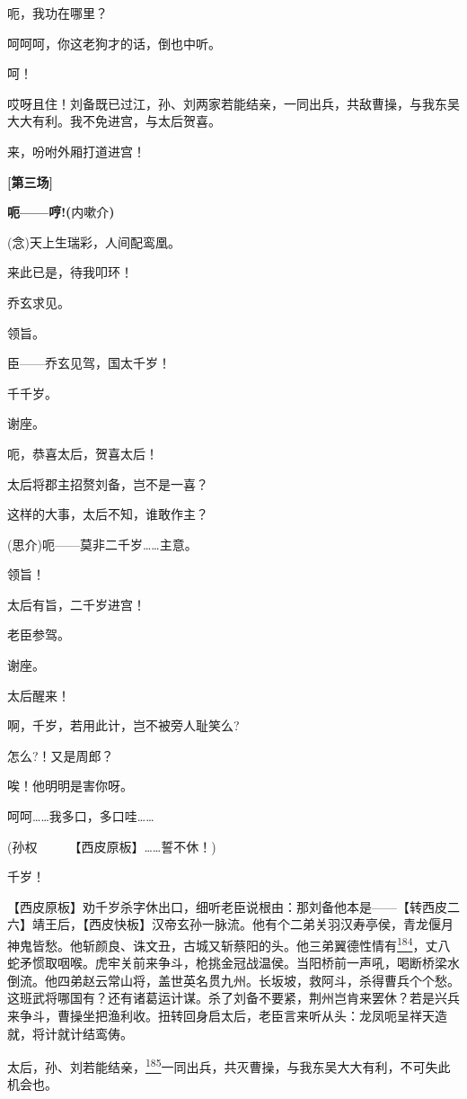 呃，我功在哪里？

呵呵呵，你这老狗才的话，倒也中听。

呵！

哎呀且住！刘备既已过江，孙、刘两家若能结亲，一同出兵，共敌曹操，与我东吴大大有利。我不免进宫，与太后贺喜。

来，吩咐外厢打道进宫！

\textbf{{[}第三场{]}}

\textbf{呃------哼!(}内嗽介\textbf{)}

(念)天上生瑞彩，人间配鸾凰。

来此已是，待我叩环！

乔玄求见。

领旨。

臣------乔玄见驾，国太千岁！

千千岁。

谢座。

呃，恭喜太后，贺喜太后！

太后将郡主招赘刘备，岂不是一喜？

这样的大事，太后不知，谁敢作主？

(思介)呃------莫非二千岁\ldots{}\ldots{}主意。

领旨！

太后有旨，二千岁进宫！

老臣参驾。

谢座。

太后醒来！

啊，千岁，若用此计，岂不被旁人耻笑么?

怎么?！又是周郎？

唉！他明明是害你呀。

呵呵\ldots{}\ldots{}我多口，多口哇\ldots{}\ldots{}

(孙权　　　【西皮原板】\ldots{}\ldots{}誓不休！)

千岁！

【西皮原板】劝千岁杀字休出口，细听老臣说根由：那刘备他本是------【转西皮二六】靖王后，【西皮快板】汉帝玄孙一脉流。他有个二弟关羽汉寿亭侯，青龙偃月神鬼皆愁。他斩颜良、诛文丑，古城又斩蔡阳的头。他三弟翼德性情有\protect\hyperlink{fn184}{\textsuperscript{184}}，丈八蛇矛惯取咽喉。虎牢关前来争斗，枪挑金冠战温侯。当阳桥前一声吼，喝断桥梁水倒流。他四弟赵云常山将，盖世英名贯九州。长坂坡，救阿斗，杀得曹兵个个愁。这班武将哪国有？还有诸葛运计谋。杀了刘备不要紧，荆州岂肯来罢休？若是兴兵来争斗，曹操坐把渔利收。扭转回身启太后，老臣言来听从头：龙凤呃呈祥天造就，将计就计结鸾俦。

太后，孙、刘若能结亲，\protect\hyperlink{fn185}{\textsuperscript{185}}一同出兵，共灭曹操，与我东吴大大有利，不可失此机会也。

